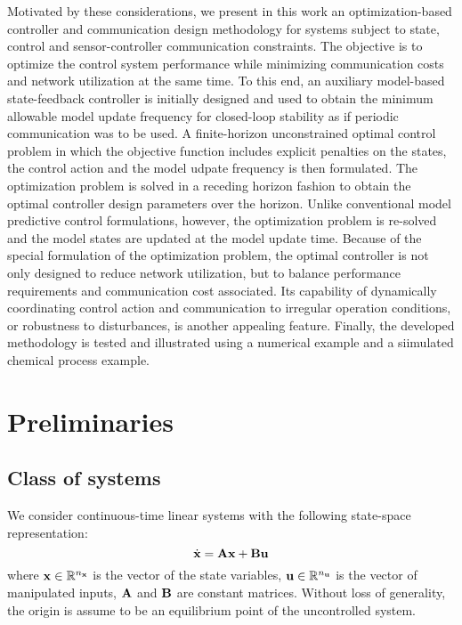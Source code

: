 \documentclass[letterpaper, 10 pt, conference]{ieeeconf}\IEEEoverridecommandlockouts%
\begin{document}
Motivated by these considerations, we present in this work an optimization-based controller and communication design methodology for systems subject to state, control and sensor-controller communication constraints. The objective is to optimize the control system performance while minimizing communication costs and network utilization at the same time. To this end, an auxiliary model-based state-feedback controller is initially designed and used to obtain the minimum allowable model update frequency for closed-loop stability as if periodic communication was to be used. A finite-horizon unconstrained optimal control problem in which the objective function includes explicit penalties on the states, the control action and the model udpate frequency is then formulated. The optimization problem is solved in a receding horizon fashion to obtain the optimal controller design parameters over the horizon. Unlike conventional model predictive control formulations, however, the optimization problem is re-solved and the model states are updated at the model update time. Because of the special formulation of the optimization problem, the optimal controller is not only designed to reduce network utilization, but to balance performance requirements and communication cost associated. Its capability of dynamically coordinating control action and communication to irregular operation conditions, or robustness to disturbances, is another appealing feature. Finally, the developed methodology is tested and illustrated using a numerical example and a siimulated chemical process example.


\section{Preliminaries}\label{sec:preliminaries}
\subsection{Class of systems}
We consider continuous-time linear systems with the following state-space representation:
\begin{equation}\label{eqn:PlantState}
  \dot{\mathbf{x}} = \mathbf{A}\mathbf{x} + \mathbf{B}\mathbf{u}
\end{equation}
where $\mathbf{x}\in\mathbb{R}^{n_{\mathbf{x}}}$ is the vector of the state variables, $\mathbf{u}\in\mathbb{R}^{n_{\mathbf{u}}}$ is the vector of manipulated inputs, $\mathbf{A}$ and $\mathbf{B}$ are constant matrices. Without loss of generality, the origin is assume to be an equilibrium point of the uncontrolled system.
\end{document}
